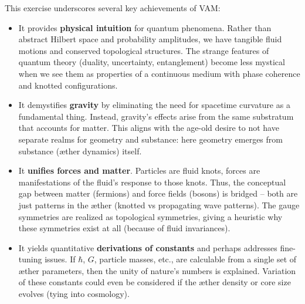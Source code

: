 \documentclass[preprint]{revtex4-2}
\begin{document}
    This exercise underscores several key achievements of VAM:
    \begin{itemize}
        \item It provides \textbf{physical intuition} for quantum phenomena. Rather than abstract Hilbert space and probability amplitudes, we have tangible fluid motions and conserved topological structures. The strange features of quantum theory (duality, uncertainty, entanglement) become less mystical when we see them as properties of a continuous medium with phase coherence and knotted configurations.
        \item It demystifies \textbf{gravity} by eliminating the need for spacetime curvature as a fundamental thing. Instead, gravity’s effects arise from the same substratum that accounts for matter. This aligns with the age-old desire to not have separate realms for geometry and substance: here geometry emerges from substance (æther dynamics) itself.
        \item It \textbf{unifies forces and matter}. Particles are fluid knots, forces are manifestations of the fluid’s response to those knots. Thus, the conceptual gap between matter (fermions) and force fields (bosons) is bridged – both are just patterns in the æther (knotted vs propagating wave patterns). The gauge symmetries are realized as topological symmetries, giving a heuristic why these symmetries exist at all (because of fluid invariances).
        \item It yields quantitative \textbf{derivations of constants} and perhaps addresses fine-tuning issues. If $\hbar$, $G$, particle masses, etc., are calculable from a single set of æther parameters, then the unity of nature’s numbers is explained. Variation of these constants could even be considered if the æther density or core size evolves (tying into cosmology).
    \end{itemize}
\end{document}
